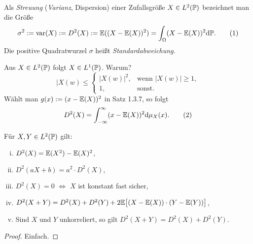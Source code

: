 \begin{defn}
  Als \emph{Streuung} (\emph{Varianz}, Dispersion) einer Zufallsgröße $X \in L^2
  ( \mathbb{P} )$  bezeichnet man die Größe
  \[ \sigma^2 := \operatorname{var}(X) := D^2(X) := \mathbb{E}( (X-\mathbb{E}(X))^2 )
    = \int_\Omega (X -\mathbb{E}(X))^2 \mathrm{d} \mathbb{P}. \tag{1} \]
  Die positive Quadratwurzel $\sigma$ heißt \emph{Standardabweichung}.
\end{defn}

\begin{rmrk*}
  Aus $X \in L^2( \mathbb{P} )$ folgt $X \in L^1( \mathbb{P} )$. Warum?
  \[ |X(w) \le
    \begin{cases}
      |X(w)|^2, &\text{wenn } |X(w)| \ge 1, \\
      1, &\text{sonst.}
    \end{cases} \]
  Wählt man $g(x) := (x - \mathbb{E}(X))^2$ in Satz 1.3.7, so folgt
  \[ D^2(X) = \int_{-\infty}^\infty (x - \mathbb{E}(X))^2 \mathrm{d} \mu_X (x). \tag{2} \]
\end{rmrk*}

\begin{thm}
  Für $X,Y \in L^2(\mathbb{P})$ gilt:
  \begin{enumerate}[(i)]
  \item $D^2(X) = \mathbb{E}( X^2 ) - \mathbb{E}( X )^2$,
  \item $D^2(aX + b) = a^2 \cdot D^2(X)$,
  \item $D^2(X) = 0$ $\Leftrightarrow$ $X$ ist konstant fast sicher,
  \item $D^2(X + Y) = D^2(X) + D^2(Y) + 2 \mathbb{E} \big[ (X - \mathbb{E}(X)) \cdot (Y -
    \mathbb{E}(Y)) \big]$,
  \item Sind $X$ und $Y$ unkorreliert, so gilt $D^2(X+Y) = D^2(X) + D^2(Y)$.
  \end{enumerate}
\end{thm}

\begin{proof}
  Einfach.
\end{proof}

